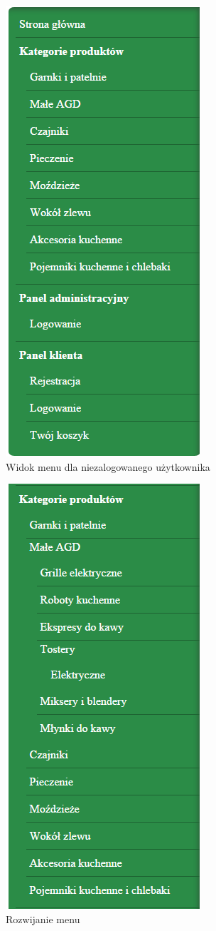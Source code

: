\begin{figure}[H]
	\centering
	\includegraphics {fig/menu_nie_zalogowany}
	\caption{Widok menu dla niezalogowanego użytkownika}
	\label{fig:nie_zalogowany}
\end{figure}

\begin{figure}[H]
	\centering
	\includegraphics {fig/menu_rozwijanie}
	\caption{Rozwijanie menu}
	\label{fig:menu_rozwijalne}
\end{figure}
